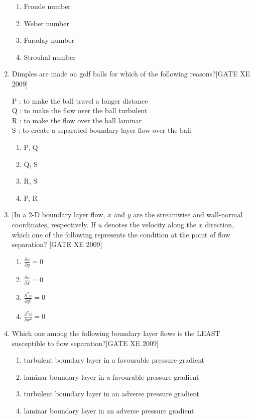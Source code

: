 \documentclass[journal,12pt,onecolumn]{IEEEtran}
\theoremstyle{remark}
\begin{document}
\begin{enumerate}
\begin{multicols}{2}
\begin{enumerate}
     \item  Froude number 
     \item  Weber number
     \item  Faraday number
     \item  Strouhal number
\end{enumerate} 
 \end{multicols}


 \item Dimples are made on golf balls for which of the following reasons?\hfill[GATE XE 2009]



\noindent
P : to make the ball travel a longer distance \\
Q : to make the flow over the ball turbulent \\
R : to make the flow over the ball laminar \\
S : to create a separated boundary layer flow over the ball



\begin{multicols}{4}
\begin{enumerate}
\item P, Q
\item Q, S 
\item R, S 
\item P, R 
\end{enumerate} 
 \end{multicols}

\item ]In a 2-D boundary layer flow, $x$ and $y$ are the streamwise and wall-normal coordinates, respectively. If $u$ denotes the velocity along the $x$ direction, which one of the following represents the condition at the point of flow separation?
\hfill[GATE XE 2009]
\begin{multicols}{4}
\begin{enumerate}
    \item $\frac{\partial u}{\partial y} = 0$
   \item $\frac{\partial u}{\partial x} = 0$
   \item $\frac{\partial^2 u}{\partial y^2} = 0$
   \item $\frac{\partial^2 u}{\partial x^2} = 0$
\end{enumerate} 
 \end{multicols}

\item Which one among the following boundary layer flows is the LEAST susceptible to flow separation?\hfill[GATE XE 2009]
\begin{enumerate}
    \item turbulent boundary layer in a favourable pressure gradient
    \item laminar boundary layer in a favourable pressure gradient
    \item turbulent boundary layer in an adverse pressure gradient
    \item laminar boundary layer in an adverse pressure gradient
\end{enumerate}


\end{enumerate}
\end{document}
